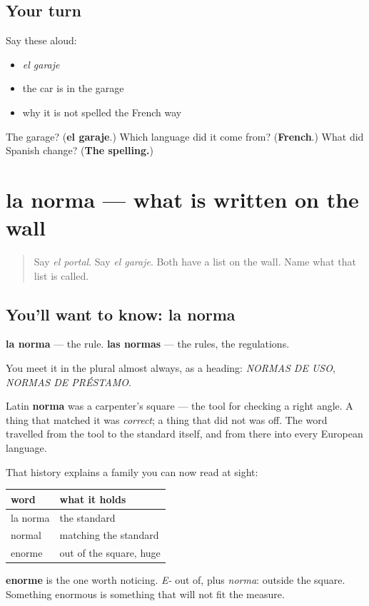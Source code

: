 \subsection*{Your turn}
Say these aloud:

\begin{itemize}
\raggedright
  \item \emph{el garaje}
  \item the car is in the garage
  \item why it is not spelled the French way
\end{itemize}

\begin{tcolorbox}[breakable,colback=teal!4,colframe=teal!35!black,title={Before you move on}]
The garage? (\textbf{el garaje}.) Which language did it come from? (\textbf{French}.) What did Spanish change? (\textbf{The spelling.})
\end{tcolorbox}
\section[la norma]{la norma — what is written on the wall}

\label{lesson:ES-C433-norma}



\begin{quote}
Say \emph{el portal}. Say \emph{el garaje}. Both have a list on the wall. Name what that list is called.
\end{quote}

\subsection*{You'll want to know: la norma}
\textbf{la norma} — the rule. \textbf{las normas} — the rules, the regulations.

You meet it in the plural almost always, as a heading: \emph{NORMAS DE USO}, \emph{NORMAS DE PRÉSTAMO}.

\begin{cousinweb}
Latin \textbf{norma} was a carpenter's square — the tool for checking a right angle. A thing that matched it was \emph{correct}; a thing that did not was off. The word travelled from the tool to the standard itself, and from there into every European language.

That history explains a family you can now read at sight:

\noindent
\begin{tabularx}{\linewidth}{@{}>{\raggedright\arraybackslash}X>{\raggedright\arraybackslash}X@{}}
\toprule
\textbf{word} & \textbf{what it holds} \\
\midrule
la norma & the standard \\
normal & matching the standard \\
enorme & out of the square, huge \\
\bottomrule
\end{tabularx}

\textbf{enorme} is the one worth noticing. \emph{E-} out of, plus \emph{norma}: outside the square. Something enormous is something that will not fit the measure.
\end{cousinweb}

